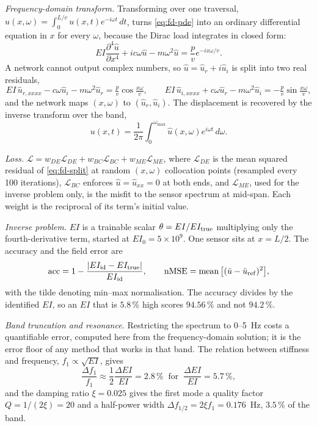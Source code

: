\emph{Frequency-domain transform.} Transforming over one traversal, $\hat u(x,\omega)=\int_0^{L/v}u(x,t)e^{-i\omega t}\,dt$, turns \cref{eq:fd-pde} into an ordinary differential equation in $x$ for every $\omega$, because the Dirac load integrates in closed form:
\begin{equation}\label{eq:fd-fd}
EI\frac{\partial^4\hat u}{\partial x^4}+ic\omega\hat u-m\omega^2\hat u=\frac pve^{-ix\omega/v}.
\end{equation}
A network cannot output complex numbers, so $\hat u=\hat u_r+i\hat u_i$ is split into two real residuals,
\begin{equation}\label{eq:fd-split}
EI\,\hat u_{r,xxxx}-c\omega\hat u_i-m\omega^2\hat u_r=\tfrac pv\cos\tfrac{x\omega}v,\qquad
EI\,\hat u_{i,xxxx}+c\omega\hat u_r-m\omega^2\hat u_i=-\tfrac pv\sin\tfrac{x\omega}v,
\end{equation}
and the network maps $(x,\omega)$ to $(\hat u_r,\hat u_i)$. The displacement is recovered by the inverse transform over the band,
\begin{equation}\label{eq:fd-inv}
u(x,t)=\frac1{2\pi}\int_0^{\omega_{\max}}\hat u(x,\omega)e^{i\omega t}\,d\omega .
\end{equation}

\emph{Loss.} $\mathcal L=w_{DE}\mathcal L_{DE}+w_{BC}\mathcal L_{BC}+w_{ME}\mathcal L_{ME}$, where $\mathcal L_{DE}$ is the mean squared residual of \cref{eq:fd-split} at random $(x,\omega)$ collocation points (resampled every 100 iterations), $\mathcal L_{BC}$ enforces $\hat u=\hat u_{xx}=0$ at both ends, and $\mathcal L_{ME}$, used for the inverse problem only, is the misfit to the sensor spectrum at mid-span. Each weight is the reciprocal of its term's initial value.

\emph{Inverse problem.} $EI$ is a trainable scalar $\theta=EI/EI_{\rm true}$ multiplying only the fourth-derivative term, started at $EI_0=5\times10^9$. One sensor sits at $x=L/2$. The accuracy and the field error are
\begin{equation}\label{eq:fd-acc}
\mathrm{acc}=1-\frac{|EI_{\rm id}-EI_{\rm true}|}{EI_{\rm id}},\qquad\mathrm{nMSE}=\operatorname{mean}\big[(\tilde u-\tilde u_{\rm ref})^2\big],
\end{equation}
with the tilde denoting min--max normalisation. The accuracy divides by the identified $EI$, so an $EI$ that is $5.8\,\%$ high scores $94.56\,\%$ and not $94.2\,\%$.

\emph{Band truncation and resonance.} Restricting the spectrum to 0--5~Hz costs a quantifiable error, computed here from the frequency-domain solution; it is the error floor of any method that works in that band. The relation between stiffness and frequency, $f_1\propto\sqrt{EI}$, gives
\begin{equation}\label{eq:fd-f1}
\frac{\Delta f_1}{f_1}\approx\frac12\frac{\Delta EI}{EI}=2.8\,\%\ \text{ for }\ \frac{\Delta EI}{EI}=5.7\,\%,
\end{equation}
and the damping ratio $\xi=0.025$ gives the first mode a quality factor $Q=1/(2\xi)=20$ and a half-power width $\Delta f_{1/2}=2\xi f_1=0.176$~Hz, $3.5\,\%$ of the band.

